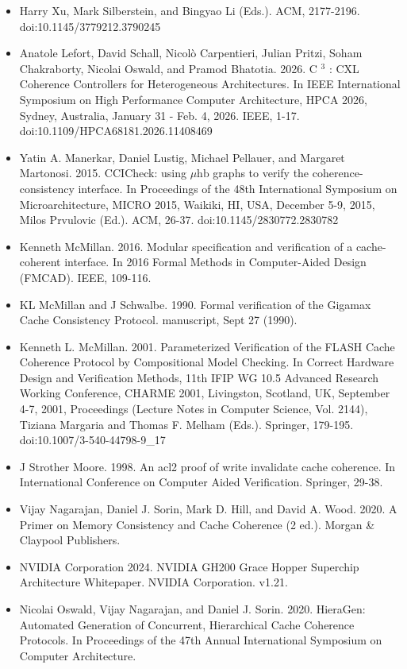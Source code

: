 \documentclass[10pt]{article}
\begin{document}
\begin{itemize}
  \item[] Harry Xu, Mark Silberstein, and Bingyao Li (Eds.). ACM, 2177-2196. doi:10.1145/3779212.3790245
  \item[] [23] Anatole Lefort, David Schall, Nicolò Carpentieri, Julian Pritzi, Soham Chakraborty, Nicolai Oswald, and Pramod Bhatotia. 2026. C ${ }^{3}$ : CXL Coherence Controllers for Heterogeneous Architectures. In IEEE International Symposium on High Performance Computer Architecture, HPCA 2026, Sydney, Australia, January 31 - Feb. 4, 2026. IEEE, 1-17. doi:10.1109/HPCA68181.2026.11408469
  \item[] [24] Yatin A. Manerkar, Daniel Lustig, Michael Pellauer, and Margaret Martonosi. 2015. CCICheck: using $\mu \mathrm{hb}$ graphs to verify the coherence-consistency interface. In Proceedings of the 48th International Symposium on Microarchitecture, MICRO 2015, Waikiki, HI, USA, December 5-9, 2015, Milos Prvulovic (Ed.). ACM, 26-37. doi:10.1145/2830772.2830782
  \item[] [25] Kenneth McMillan. 2016. Modular specification and verification of a cache-coherent interface. In 2016 Formal Methods in Computer-Aided Design (FMCAD). IEEE, 109-116.
  \item[] [26] KL McMillan and J Schwalbe. 1990. Formal verification of the Gigamax Cache Consistency Protocol. manuscript, Sept 27 (1990).
  \item[] [27] Kenneth L. McMillan. 2001. Parameterized Verification of the FLASH Cache Coherence Protocol by Compositional Model Checking. In Correct Hardware Design and Verification Methods, 11th IFIP WG 10.5 Advanced Research Working Conference, CHARME 2001, Livingston, Scotland, UK, September 4-7, 2001, Proceedings (Lecture Notes in Computer Science, Vol. 2144), Tiziana Margaria and Thomas F. Melham (Eds.). Springer, 179-195. doi:10.1007/3-540-44798-9\_17
  \item[] [28] J Strother Moore. 1998. An acl2 proof of write invalidate cache coherence. In International Conference on Computer Aided Verification. Springer, 29-38.
  \item[] [29] Vijay Nagarajan, Daniel J. Sorin, Mark D. Hill, and David A. Wood. 2020. A Primer on Memory Consistency and Cache Coherence (2 ed.). Morgan \& Claypool Publishers.
  \item[] [30] NVIDIA Corporation 2024. NVIDIA GH200 Grace Hopper Superchip Architecture Whitepaper. NVIDIA Corporation. v1.21.
  \item[] [31] Nicolai Oswald, Vijay Nagarajan, and Daniel J. Sorin. 2020. HieraGen: Automated Generation of Concurrent, Hierarchical Cache Coherence Protocols. In Proceedings of the 47th Annual International Symposium on Computer Architecture.

\end{itemize}
\end{document}
